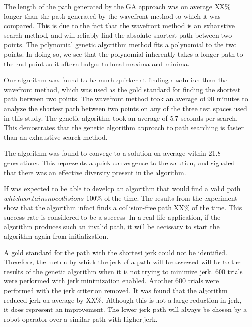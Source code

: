 	
The length of the path generated by the GA approach was on average XX\% longer than the path generated by the wavefront method to which it was compared. This is due to the fact that the wavefront method is an exhaustive search method, and will reliably find the absolute shortest path between two points. The polynomial genetic algorithm method fits a polynomial to the two points. In doing so, we see that the polynomial inherently takes a longer path to the end point as it oftern bulges to local maxima and minima.

Our algorithm was found to be much quicker at finding a solution than the wavefront method, which was used as the gold standard for finding the shortest path between two points. The wavefront method took an average of 90 minutes to analyze the shortest path between two points on any of the three test spaces used in this study. The genetic algorithm took an average of 5.7 seconds per search. This demostrates that the genetic algorithm approach to path searching is faster than an exhaustive search method.

The algorithm was found to convege to a solution on average within 21.8 generations. This represents a quick convergence to the solution, and signaled that there was an effective diversity present in the algorithm.

If was expected to be able to develop an algorithm that would find a valid path \(which contains no collisions\) 100\% of the time. The results from the experiment show that the algorithm infact finds a collision-free path XX\% of the time. This success rate is considered to be a success. In a real-life application, if the algorithm produces such an invalid path, it will be necissary to start the algorithm again from initialization. 

A gold standard for the path with the shortest jerk could not be identified. Therefore, the metric by which the jerk of a path will be assessed will be to the results of the genetic algorithm when it is not trying to minimize jerk. 600 trials were performed with jerk minimization enabled. Another 600 trials were performed with the jerk criterion removed. It was found that the algorithm reduced jerk on average by XX\%. Although this is not a large reduction in jerk, it does represent an improvement. The lower jerk path will always be chosen by a robot operator over a similar path with higher jerk.



